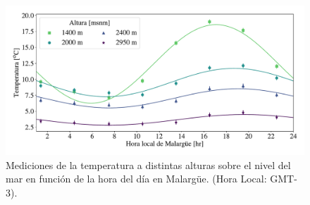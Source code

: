 \begin{figure}[H]
	\centering
	\includegraphics[width=\textwidth]{delay_v2.pdf}
	\caption{Mediciones de la temperatura a distintas alturas sobre el nivel del mar en función de la hora del día en Malargüe. (Hora Local: GMT-3).}
	\label{fig:delay}
\end{figure}
